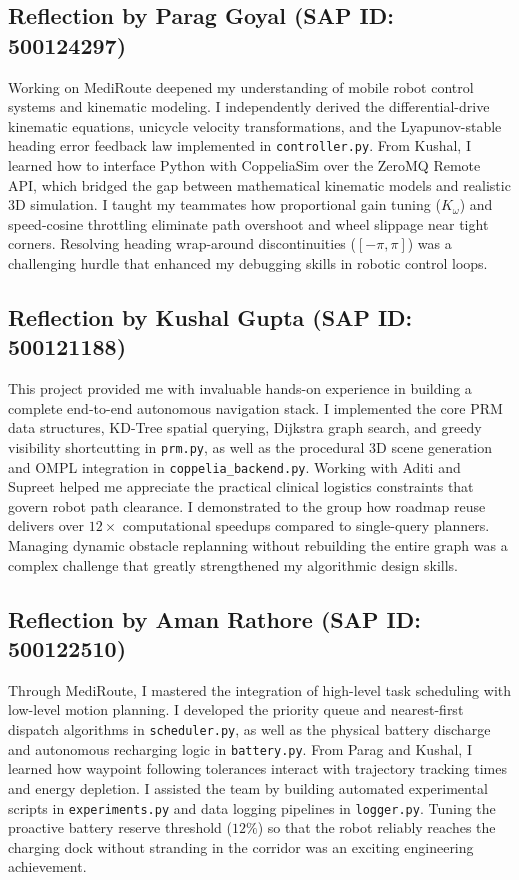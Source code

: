 \documentclass[12pt,a4paper]{article}
\begin{document}
\subsection*{Reflection by Parag Goyal (SAP ID: 500124297)}
Working on MediRoute deepened my understanding of mobile robot control systems and kinematic modeling. I independently derived the differential-drive kinematic equations, unicycle velocity transformations, and the Lyapunov-stable heading error feedback law implemented in \texttt{controller.py}. From Kushal, I learned how to interface Python with CoppeliaSim over the ZeroMQ Remote API, which bridged the gap between mathematical kinematic models and realistic 3D simulation. I taught my teammates how proportional gain tuning ($K_\omega$) and speed-cosine throttling eliminate path overshoot and wheel slippage near tight corners. Resolving heading wrap-around discontinuities ($[-\pi, \pi]$) was a challenging hurdle that enhanced my debugging skills in robotic control loops.

\subsection*{Reflection by Kushal Gupta (SAP ID: 500121188)}
This project provided me with invaluable hands-on experience in building a complete end-to-end autonomous navigation stack. I implemented the core PRM data structures, KD-Tree spatial querying, Dijkstra graph search, and greedy visibility shortcutting in \texttt{prm.py}, as well as the procedural 3D scene generation and OMPL integration in \texttt{coppelia\_backend.py}. Working with Aditi and Supreet helped me appreciate the practical clinical logistics constraints that govern robot path clearance. I demonstrated to the group how roadmap reuse delivers over $12\times$ computational speedups compared to single-query planners. Managing dynamic obstacle replanning without rebuilding the entire graph was a complex challenge that greatly strengthened my algorithmic design skills.

\subsection*{Reflection by Aman Rathore (SAP ID: 500122510)}
Through MediRoute, I mastered the integration of high-level task scheduling with low-level motion planning. I developed the priority queue and nearest-first dispatch algorithms in \texttt{scheduler.py}, as well as the physical battery discharge and autonomous recharging logic in \texttt{battery.py}. From Parag and Kushal, I learned how waypoint following tolerances interact with trajectory tracking times and energy depletion. I assisted the team by building automated experimental scripts in \texttt{experiments.py} and data logging pipelines in \texttt{logger.py}. Tuning the proactive battery reserve threshold ($12\%$) so that the robot reliably reaches the charging dock without stranding in the corridor was an exciting engineering achievement.
\end{document}
